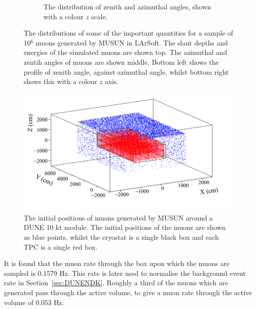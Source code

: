 \begin{figure}[h!]
\begin{subfigure}{0.45\textwidth}
    \caption{The distribution of zenith and azimuthal angles, shown with a colour $z$ scale.}
  \end{subfigure}
  \caption[The distributions of some of the important quantities for a sample of 10$^6$ muons generated by MUSUN in LArSoft]
          {The distributions of some of the important quantities for a sample of 10$^6$ muons generated by MUSUN in LArSoft. The slant depths and energies of the simulated muons are shown top. The azimuthal and zentih angles of muons are shown middle. Bottom left shows the profile of zenith angle, against azimuthal angle, whilst bottom right shows this with a colour $z$ axis.}
  \label{fig:MUSUNIncorp}
\end{figure}

\begin{figure}[h!]
  \centering
  \includegraphics[width=\textwidth]{MuonPosCan}
  \caption[The initial positions of muons generated by MUSUN around a DUNE 10 kt module]
          {The initial positions of muons generated by MUSUN around a DUNE 10 kt module. The initial positions of the muons are shown as blue points, whilst the cryostat is a single black box and each TPC is a single red box.}
  \label{fig:10ktPos}
\end{figure}

It is found that the muon rate through the box upon which the muons are sampled is 0.1579 Hz. This rate is later used to normalise the background event rate in Section~\ref{sec:DUNENDK}. Roughly a third of the muons which are generated pass through the active volume, to give a muon rate through the active volume of 0.053 Hz. \\ 

